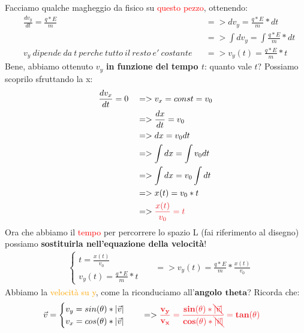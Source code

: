             Facciamo qualche magheggio da fisico su \textcolor{Red}{questo pezzo}, ottenendo:
            \begin{align*}
                & \frac{dv_y}{dt}=\frac{q*E}{m} && => dv_y=\frac{q*E}{m} * dt\\
                & && => \int dv_y = \int \frac{q*E}{m} * dt\\
                & v_y\ dipende\ da\ t\ perche\ tutto\ il\ resto\ e'\ costante && => v_y(t) = \frac{q*E}{m}*t
            \end{align*}
            Bene, abbiamo ottenuto $v_y$ \textbf{in funzione del tempo $t$}: quanto vale $t$? Possiamo scoprilo sfruttando la x:
            \begin{align*}
                &\frac{dv_x}{dt}=0 && => v_x = const = v_0\\
                & && => \frac{dx}{dt}= v_0\\
                & && => dx = v_0 dt\\
                & && => \int dx = \int v_0 dt\\
                & && => \int dx = v_0 \int dt\\
                & && => x(t) = v_0*t\\
                & && => \textcolor{Red}{\frac{x(t)}{v_0} = t}
            \end{align*}
            Ora che abbiamo il \textcolor{Red}{tempo} per percorrere lo spazio L (fai riferimento al disegno) possiamo \textbf{sostituirla nell'equazione della velocità}!
            \begin{align*}
                &\begin{cases}
                    t = \frac{x(t)}{v_0}\\
                    v_y(t) = \frac{q*E}{m}*t
                \end{cases}
                && => v_y(t) = \frac{q*E}{m}*\frac{x(t)}{v_0}
            \end{align*}
            Abbiamo la \textcolor{Orange}{velocità su y}, come la riconduciamo all'\textbf{angolo $\mathbf{theta}$}? Ricorda che:
            \begin{align*}
                &\vec{v} =
                \begin{cases}
                    v_y = sin(\theta)*|\vec{v}|\\
                    v_x = cos(\theta)*|\vec{v}|\\
                \end{cases} && => \mathbf{\textcolor{Red}{\frac{v_y}{v_x} = \frac{sin(\theta)*\bcancel{|\vec{v}|}}{cos(\theta)*\bcancel{|\vec{v}|}} = tan(\theta)}}
            \end{align*}

